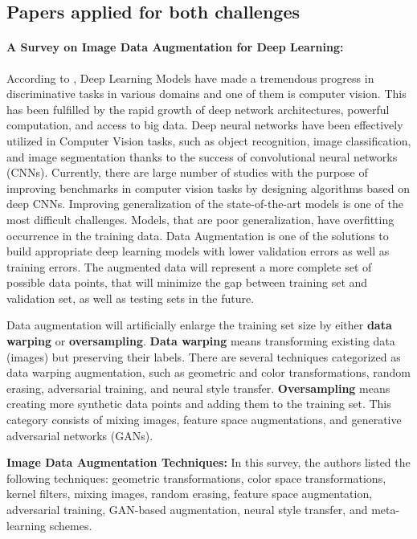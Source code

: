 \documentclass[10pt,twocolumn,letterpaper]{article}
\begin{document}
\subsection{Papers applied for both challenges}
\label{subsection:literature-both-challenges}
\paragraph{A Survey on Image Data Augmentation for Deep Learning:}
According to \cite{data_aug_survey_2019}, Deep Learning Models have made a tremendous progress in discriminative tasks in various domains and one of them is computer vision. This has been fulfilled by the rapid growth of deep network architectures, powerful computation, and access to big data. Deep neural networks have been effectively utilized in Computer Vision tasks, such as object recognition, image classification, and image segmentation thanks to the success of convolutional neural networks (CNNs). Currently, there are large number of studies with the purpose of improving benchmarks in computer vision tasks by designing algorithms based on deep CNNs. Improving generalization of the state-of-the-art models is one of the most difficult challenges. Models, that are poor generalization, have overfitting occurrence in the training data. Data Augmentation is one of the solutions to build appropriate deep learning models with lower validation errors as well as training errors. The augmented data will represent a more complete set of possible data points, that will minimize the gap between training set and validation set, as well as testing sets in the future.

Data augmentation will artificially enlarge the training set size by either \textbf{data warping} or \textbf{oversampling}. \textbf{Data warping} means transforming existing data (images) but preserving their labels. There are several techniques categorized as data warping augmentation, such as geometric and color transformations, random erasing, adversarial training, and neural style transfer. \textbf{Oversampling} means creating more synthetic data points and adding them to the training set. This category consists of mixing images, feature space augmentations, and generative adversarial networks (GANs).

\textbf{Image Data Augmentation Techniques:} In this survey, the authors listed the following techniques: geometric transformations, color space transformations, kernel filters, mixing images, random erasing, feature space augmentation, adversarial training, GAN-based augmentation, neural style transfer, and meta-learning schemes.
\end{document}
